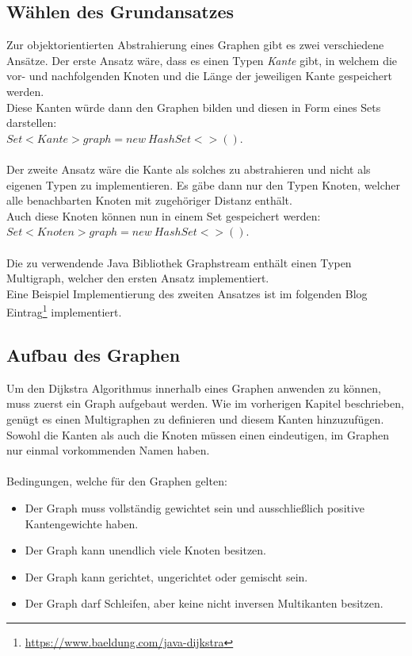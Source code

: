\documentclass[a4paper]{article}
\begin{document}
\subsection{Wählen des Grundansatzes}

Zur objektorientierten Abstrahierung eines Graphen gibt es zwei verschiedene Ansätze. Der erste Ansatz wäre, dass es einen Typen \textit{Kante} gibt, in welchem die vor- und nachfolgenden Knoten und die Länge der jeweiligen Kante gespeichert werden.\\
Diese Kanten würde dann den Graphen bilden und diesen in Form eines Sets darstellen:\\$Set <Kante> graph = new\ HashSet<>()$.\\\\
Der zweite Ansatz wäre die Kante als solches zu abstrahieren und nicht als eigenen Typen zu implementieren. Es gäbe dann nur den Typen Knoten, welcher alle benachbarten Knoten mit zugehöriger Distanz enthält.\\
Auch diese Knoten können nun in einem Set gespeichert werden:\\
$Set<Knoten> graph = new\ HashSet<>()$.\\\\
Die zu verwendende Java Bibliothek Graphstream enthält einen Typen Multigraph, welcher den ersten Ansatz implementiert.\\
Eine Beispiel Implementierung des zweiten Ansatzes ist im folgenden Blog Eintrag\footnote{\url{https://www.baeldung.com/java-dijkstra}} implementiert.



\subsection{Aufbau des Graphen}

Um den Dijkstra Algorithmus innerhalb eines Graphen anwenden zu können, muss zuerst ein Graph aufgebaut werden.
Wie im vorherigen Kapitel beschrieben, genügt es einen Multigraphen zu definieren und diesem Kanten hinzuzufügen.
Sowohl die Kanten als auch die Knoten müssen einen eindeutigen, im Graphen nur einmal vorkommenden Namen haben.\\\\
Bedingungen, welche für den Graphen gelten:
\begin{itemize}
    \item Der Graph muss vollständig gewichtet sein und ausschließlich positive Kantengewichte haben.
    \item Der Graph kann unendlich viele Knoten besitzen.
    \item Der Graph kann gerichtet, ungerichtet oder gemischt sein.
    \item Der Graph darf Schleifen, aber keine nicht inversen Multikanten besitzen.
\end{itemize}
\end{document}
